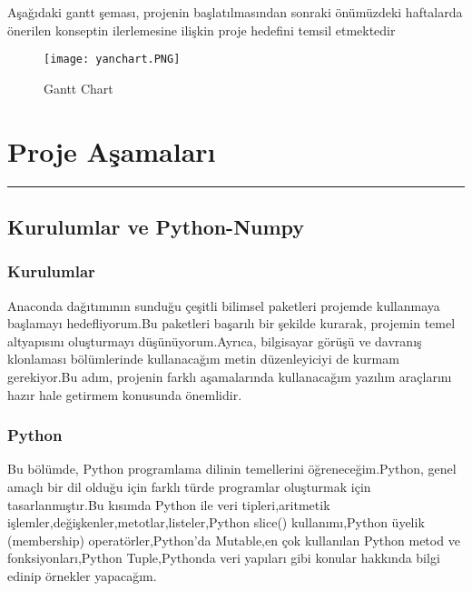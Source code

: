 \documentclass{article}
\begin{document}
Aşağıdaki gantt şeması, projenin başlatılmasından sonraki önümüzdeki haftalarda önerilen konseptin ilerlemesine ilişkin proje hedefini temsil etmektedir\\[15pt]

\begin{landscape}
\thispagestyle{empty} %
    \begin{figure}
     \centering
  \texttt{[image: yanchart.PNG]}\centering %
  \caption{Gantt Chart}
  \label{fig:resim_etiketi}
\end{figure}

\end{landscape}



\newpage


\section{Proje Aşamaları}
\rule{\textwidth}{0.5pt}

\subsection{Kurulumlar ve Python-Numpy}
\subsubsection{Kurulumlar}Anaconda dağıtımının sunduğu çeşitli bilimsel paketleri projemde kullanmaya başlamayı hedefliyorum.Bu paketleri başarılı bir şekilde kurarak, projemin temel altyapısını oluşturmayı düşünüyorum.Ayrıca, bilgisayar görüşü ve davranış klonlaması bölümlerinde kullanacağım metin düzenleyiciyi de kurmam gerekiyor.Bu adım, projenin farklı aşamalarında kullanacağım yazılım araçlarını hazır hale getirmem konusunda önemlidir.
\subsubsection{Python}Bu bölümde, Python programlama dilinin temellerini öğreneceğim.Python, genel amaçlı bir dil olduğu için farklı türde programlar oluşturmak için tasarlanmıştır.Bu kısımda Python ile veri tipleri,aritmetik işlemler,değişkenler,metotlar,listeler,Python slice() kullanımı,Python üyelik (membership) operatörler,Python'da Mutable,en çok kullanılan Python metod ve fonksiyonları,Python Tuple,Pythonda veri yapıları gibi konular hakkında bilgi edinip örnekler yapacağım.
\end{document}
